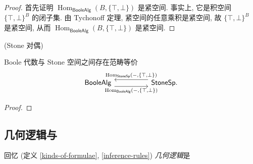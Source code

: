 \begin{proof}
	首先证明 $\operatorname{Hom}_{\mathsf {BooleAlg}}(B,\{\top,\bot\})$ 是紧空间. 事实上, 它是积空间 $\{\top,\bot\}^{B}$ 的闭子集. 由 Tychonoff 定理, 紧空间的任意乘积是紧空间, 故 $\{\top,\bot\}^{B}$ 是紧空间, 从而 $\operatorname{Hom}_{\mathsf {BooleAlg}}(B,\{\top,\bot\})$ 是紧空间.
	\todo{}
\end{proof}

\begin{prop}
	{(Stone 对偶)}
	
	Boole 代数与 Stone 空间之间存在范畴等价
	\[\begin{tikzcd}[ampersand replacement=\&]
		{\mathsf {BooleAlg}} \&\& {\mathsf {StoneSp}.}
		\arrow["{\operatorname{Hom}_{\mathsf {BooleAlg}}(-,\{\top,\bot\})}"', shift right=2, from=1-1, to=1-3]
		\arrow["{\operatorname{Hom}_{\mathsf {StoneSp}}(-,\{\top,\bot\})}"', shift right=2, from=1-3, to=1-1]
	\end{tikzcd}\]
\end{prop}

\begin{proof}
	
\end{proof}

\todo{}

\subsection{几何逻辑与\fm{}}

回忆 (定义 \ref{kinds-of-formulae}, \ref{inference-rules}) \emph{几何逻辑}是

